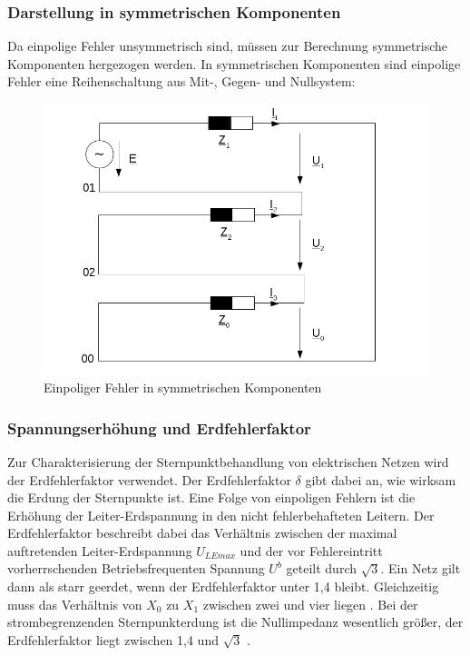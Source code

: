 \documentclass{scrartcl}
\begin{document}
\begin{onehalfspace}
\subsubsection{Darstellung in symmetrischen Komponenten}
Da einpolige Fehler unsymmetrisch sind, müssen zur Berechnung symmetrische Komponenten hergezogen werden. In symmetrischen Komponenten sind einpolige Fehler eine Reihenschaltung aus Mit-, Gegen- und Nullsystem: \\

	\begin{figure}[H]
	\centering
	\includegraphics[scale=0.6]{img/einpol-fehler.png}
	\caption{Einpoliger Fehler in symmetrischen Komponenten}
	\label{einpol-fehler}
	\end{figure}
	
\subsubsection{Spannungserhöhung und Erdfehlerfaktor}
Zur Charakterisierung der Sternpunktbehandlung von elektrischen Netzen wird der Erdfehlerfaktor verwendet. Der Erdfehlerfaktor $\delta$ gibt dabei an, wie wirksam die Erdung der Sternpunkte ist. Eine Folge von einpoligen Fehlern ist die Erhöhung der Leiter-Erdspannung in den nicht fehlerbehafteten Leitern. Der Erdfehlerfaktor beschreibt dabei das Verhältnis zwischen der maximal auftretenden Leiter-Erdspannung $U_{LEmax}$ und der vor Fehlereintritt vorherrschenden Betriebsfrequenten Spannung $U^b$ geteilt durch $\sqrt{3}$. Ein Netz gilt dann als \glqq starr geerdet\grqq, wenn der Erdfehlerfaktor unter 1,4 bleibt. Gleichzeitig muss das Verhältnis von $X_0$ zu $X_1$ zwischen zwei und vier liegen \cite[S. 39]{Schlabbach2002}. Bei der strombegrenzenden Sternpunkterdung ist die Nullimpedanz wesentlich größer, der Erdfehlerfaktor liegt zwischen 1,4 und $\sqrt{3}$ \cite[S. 33 ff]{Schlabbach2002}.


\end{onehalfspace}
\end{document}
